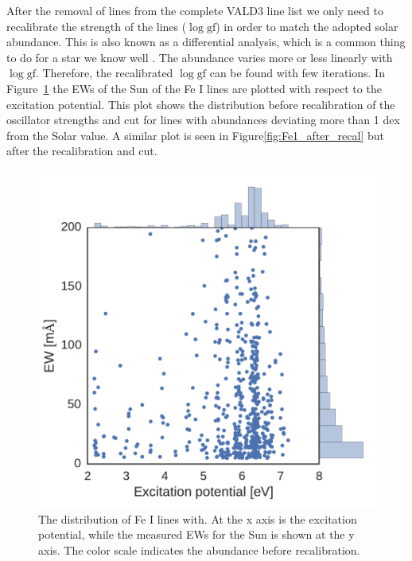 \documentclass{aa}
\begin{document}
After the removal of lines from the complete VALD3 line list we only
need to recalibrate the strength of the lines ($\log \mathrm{gf}$) in
order to match the adopted solar abundance. This is also known as a
differential analysis, which is a common thing to do for a star we know
well \citep{Onehag2012}. The abundance varies more or less linearly
with $\log \mathrm{gf}$. Therefore, the recalibrated $\log \mathrm{gf}$
can be found with few iterations. In Figure~\ref{fig:Fe1_before_recal}
the EWs of the Sun of the Fe I lines are plotted with respect to
the excitation potential. This plot shows the distribution before
recalibration of the oscillator strengths and cut for lines with
abundances deviating more than 1 dex from the Solar value. A similar
plot is seen in Figure\ref{fig:Fe1_after_recal} but after the
recalibration and cut.

\begin{figure}[tpb]
    \centering
    \includegraphics[width=1.0\linewidth]{figures/EWvsEP.pdf}
    \caption{The distribution of Fe I lines with. At the x axis is the
    excitation potential, while the measured EWs for the Sun is shown at the y axis. The
    color scale indicates the abundance before recalibration.}
    \label{fig:Fe1_before_recal}
\end{figure}
\end{document}
